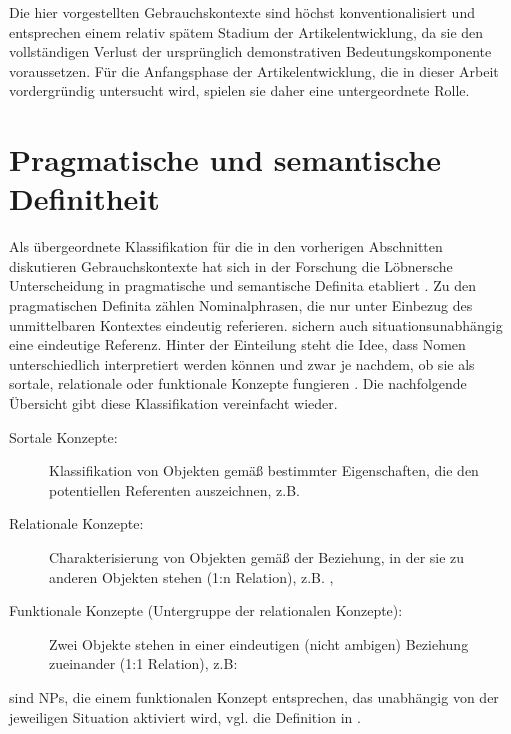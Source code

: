 Die hier vorgestellten Gebrauchskontexte sind höchst konventionalisiert und entsprechen einem relativ spätem Stadium der Artikelentwicklung, da sie den vollständigen Verlust der ursprünglich demonstrativen Bedeutungskomponente voraussetzen. Für die Anfangsphase der Artikelentwicklung, die in dieser Arbeit vordergründig untersucht wird, spielen sie daher eine untergeordnete Rolle.


\section{Pragmatische und semantische Definitheit}\label{sec:pragsem}

Als übergeordnete Klassifikation für die in den vorherigen Abschnitten diskutieren Gebrauchskontexte hat sich in der Forschung die Löbnersche Unterscheidung in pragmatische  und semantische Definita  \parencite{Lobner1985} etabliert \parencite{Himmelmann1997, Demske2001,Nubling2005,Napoli2009,Szczepaniak2011a}. Zu den pragmatischen Definita  zählen  Nominalphrasen, die nur unter Einbezug des unmittelbaren Kontextes eindeutig referieren.  sichern auch situationsunabhängig eine eindeutige Referenz. Hinter der Einteilung steht die Idee, dass Nomen unterschiedlich interpretiert werden können und zwar je nachdem, ob sie als sortale, relationale oder funktionale Konzepte fungieren \parencite{Lobner1985,Lobner1998}. Die nachfolgende Übersicht gibt diese Klassifikation vereinfacht wieder. 

\begin{description} 
		\item[Sortale Konzepte:] \label{sort} Klassifikation von Objekten gemäß bestimmter Eigenschaften, die den potentiellen Referenten auszeichnen, z.B.  
		\item[Relationale Konzepte:] \label{relat} Charakterisierung von Objekten gemäß der Beziehung, in der sie zu anderen Objekten stehen (1:n Relation), z.B. ,  
		\item[Funktionale Konzepte (Untergruppe der relationalen Konzepte):] \label{funkt} Zwei Objekte stehen in einer eindeutigen (nicht ambigen) Beziehung zueinander (1:1 Relation), z.B:  
\end{description} 

\noindent
{} sind  NPs, die einem funktionalen Konzept entsprechen, das unabhängig von der jeweiligen Situation aktiviert wird, vgl. die Definition in . 

